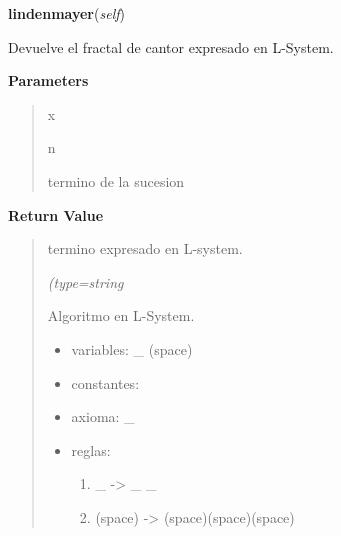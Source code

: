 \hspace{.8\funcindent}\begin{boxedminipage}{\funcwidth}

    \raggedright \textbf{lindenmayer}(\textit{self})

\setlength{\parskip}{2ex}
    Devuelve el fractal de cantor expresado en L-System.

\setlength{\parskip}{1ex}
      \textbf{Parameters}
      \vspace{-1ex}

      \begin{quote}
        \begin{Ventry}{x}

          \item[n]

          termino de la sucesion

        \end{Ventry}

      \end{quote}

      \textbf{Return Value}
    \vspace{-1ex}

      \begin{quote}
      termino expresado en L-system.

      {\it (type=string

      Algoritmo en L-System.

      \begin{itemize}
      \setlength{\parskip}{0.6ex}
        \item variables: \_ (space)

        \item constantes:

        \item axioma: \_

        \item reglas:

          \begin{enumerate}

          \setlength{\parskip}{0.5ex}
            \item \_ -{\textgreater} \_ \_

            \item (space) -{\textgreater} (space)(space)(space)

          \end{enumerate}

      \end{itemize}

}
\end{quote}
\end{boxedminipage}
